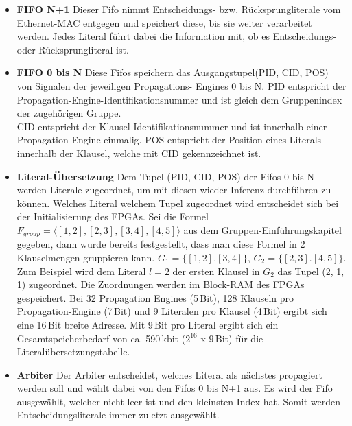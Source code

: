 \begin{itemize}
\item
  \textbf{FIFO N+1}\newline
  Dieser Fifo nimmt Entscheidungs- bzw. Rücksprungliterale vom Ethernet-MAC
  entgegen und speichert diese, bis sie weiter verarbeitet werden. Jedes
  Literal führt dabei die Information mit, ob es Entscheidungs- oder
  Rücksprungliteral ist.
\item
  \textbf{FIFO 0 bis N}\newline
  Diese Fifos speichern das Ausgangstupel(PID, CID, POS) von Signalen
  der jeweiligen Propagations- Engines 0 bis N. PID entspricht
  der Propagation-Engine-Identifikationsnummer und
  ist gleich dem Gruppenindex der zugehörigen Gruppe.\\
  CID entspricht der Klausel-Identifikationsnummer und ist innerhalb einer
  Propagation-Engine einmalig. POS entspricht der Position eines Literals innerhalb
  der Klausel, welche mit CID gekennzeichnet ist.
\item
  \textbf{Literal-Übersetzung}\newline
  Dem Tupel (PID, CID, POS) der Fifos 0 bis N werden 
  Literale zugeordnet, um mit diesen wieder Inferenz
  durchführen zu können. Welches Literal welchem Tupel
  zugeordnet wird entscheidet sich bei der Initialisierung
  des FPGAs. Sei die Formel
  $F_{group} = \langle[1,2],[2,3],[3,4],[4,5]\rangle$
  aus dem Gruppen-Einführungskapitel gegeben, dann wurde bereits festgestellt, dass man
  diese Formel in 2 Klauselmengen gruppieren kann. $G_1 = \{[1,2].[3,4]\}$, $G_2 = \{[2,3].[4,5]\}$.
  Zum Beispiel wird dem Literal $l = 2$ der ersten Klausel in $G_2$ das Tupel (2, 1, 1) zugeordnet.
  Die Zuordnungen werden im Block-RAM des FPGAs gespeichert. Bei
  32 Propagation Engines (5\,Bit), 128 Klauseln pro Propagation-Engine (7\,Bit) und
  9 Literalen pro Klausel (4\,Bit) ergibt sich eine 16\,Bit breite Adresse.
  Mit 9\,Bit pro Literal ergibt sich ein Gesamtspeicherbedarf von ca. 590\,kbit 
  ($2^{16}$ x $9$\,Bit) für die Literalübersetzungstabelle.

\item
  \textbf{Arbiter}\newline
  Der Arbiter entscheidet, welches Literal als nächstes propagiert werden soll
  und wählt dabei von den Fifos 0 bis N+1 aus. Es wird der Fifo ausgewählt, 
  welcher nicht leer ist und 
  den kleinsten Index hat. Somit werden Entscheidungsliterale immer
  zuletzt ausgewählt.


\end{itemize}
